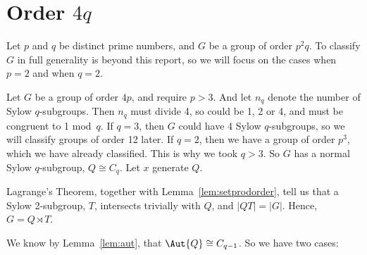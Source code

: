
\section{Order \(4q\)}
Let \(p\) and \(q\) be distinct prime numbers, and \(G\) be a group of order \(p^2q\).
To classify \(G\) in full generality is beyond this report, so we will focus on the cases when \(p = 2\) and when \(q =
2\).

Let \(G\) be a group of order \(4p\), and require \(p > 3\).
And let \(n_q\) denote the number of Sylow \(q\)-subgroups.
Then \(n_q\) must divide 4, so could be 1, 2 or 4, and must be congruent to 1 mod~\(q\).
If \(q = 3\), then \(G\) could have 4 Sylow \(q\)-subgroups, so we will classify groups of order 12 later.
If \(q = 2\), then we have a group of order \(p^3\), which we have already classified.
This is why we took \(q > 3\).
So \(G\) has a normal Sylow \(q\)-subgroup, \(Q \cong C_q\).
Let \(x\) generate \(Q\).

Lagrange's Theorem, together with Lemma~\ref{lem:setprodorder}, tell us that a Sylow 2-subgroup, \(T\), intersects
trivially with \(Q\), and \(|QT| = |G|\).
Hence, \(G = Q \rtimes T\).

We know by Lemma~\ref{lem:aut}, that \(\Aut{Q} \cong C_{q-1}\).
So we have two cases:

